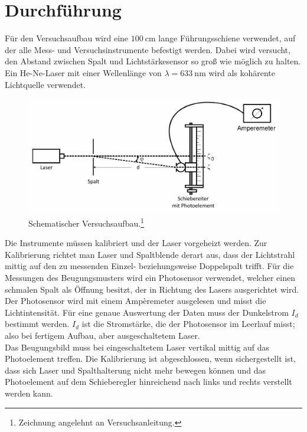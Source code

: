 \section{Durchführung}
\label{sec:Durchführung}

Für den Versuchsaufbau wird eine $\SI{100}{\centi\meter}$ lange Führungsschiene verwendet, auf der alle Mess- und Versuchsinstrumente befestigt werden.
Dabei wird versucht, den Abstand zwischen Spalt und Lichtstärkesensor so groß wie möglich zu halten.
Ein He-Ne-Laser mit einer Wellenlänge von $\lambda = \SI{633}{\nano\meter}$ wird als kohärente Lichtquelle verwendet.

\begin{figure}
    \centering
    \includegraphics[width=\textwidth]{plots/Versuchsaufbau.png}
    \caption{Schematischer Versuchsaufbau.\footnote{Zeichnung angelehnt an Versuchsanleitung.\cite{Versuchsanleitung}}}
    \label{fig:schemAufbau}
\end{figure}

\FloatBarrier

Die Instrumente müssen kalibriert und der Laser vorgeheizt werden.
Zur Kalibrierung richtet man Laser und Spaltblende derart aus, dass der Lichtstrahl mittig auf den zu messenden Einzel- beziehungsweise Doppelspalt trifft.
Für die Messungen des Beugungsmusters wird ein Photosensor verwendet, welcher einen schmalen Spalt als Öffnung besitzt, der in Richtung des Lasers ausgerichtet wird.
Der Photosensor wird mit einem Ampèremeter ausgelesen und misst die Lichtintensität. Für eine genaue Auswertung der Daten muss der Dunkelstrom $I_d$ bestimmt werden.
$I_d$ ist die Stromstärke, die der Photosensor im Leerlauf misst; also bei fertigem Aufbau, aber ausgeschaltetem Laser.\\
Das Beugungsbild muss bei eingeschaltetem Laser vertikal mittig auf das Photoelement treffen.
Die Kalibrierung ist abgeschlossen, wenn sichergestellt ist, dass sich Laser und Spalthalterung nicht mehr bewegen können und das Photoelement auf dem Schieberegler hinreichend nach links
und rechts verstellt werden kann.\\

